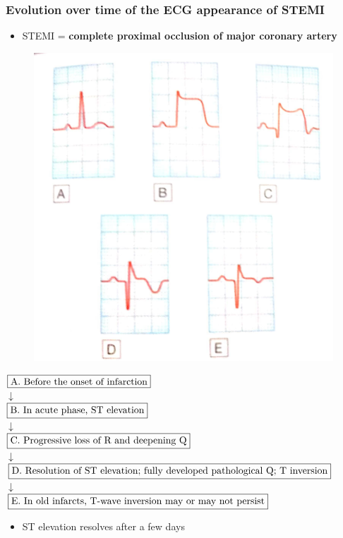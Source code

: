 \documentclass[
  12pt,
]{memoir}
\providecommand{\tightlist}{%
  \setlength{\itemsep}{0pt}\setlength{\parskip}{0pt}}
\begin{document}
\pagebreak

\hypertarget{evolution-over-time-of-the-ecg-appearance-of-stemi}{%
\subsubsection{Evolution over time of the ECG appearance of
STEMI}\label{evolution-over-time-of-the-ecg-appearance-of-stemi}}

\begin{itemize}
\tightlist
\item
  STEMI = \textbf{complete proximal occlusion of major coronary artery}
\end{itemize}

\begin{figure}
\centering
\includegraphics[width=.5\textwidth]{../assets/med/STEMI.jpg}
\end{figure}

\begin{center}
$\fbox{A. Before the onset of infarction}$\\
$\downarrow$\\
$\fbox{B. In acute phase, ST elevation}$\\
$\downarrow$\\
$\fbox{C. Progressive loss of R and deepening Q}$\\
$\downarrow$\\
$\fbox{D. Resolution of ST elevation; fully developed pathological Q;
T inversion}$\\
$\downarrow$\\
$\fbox{E. In old infarcts, T-wave inversion may or may not persist}$\\
\end{center}

\begin{itemize}
\tightlist
\item
  ST elevation resolves after a few days
\end{itemize}
\end{document}
